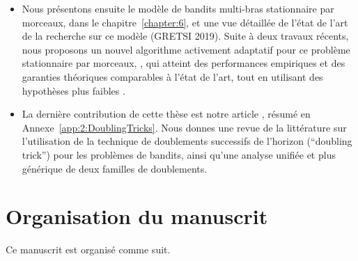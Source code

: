 \begin{resume_fr}
\begin{itemize}
    \item
    Nous présentons ensuite le modèle de bandits multi-bras stationnaire par morceaux, dans le chapitre~\ref{chapter:6}, et une vue détaillée de l'état de l'art de la recherche sur ce modèle \cite{Besson2019GLRT,Besson2019Gretsi} (GRETSI 2019).
    Suite à deux travaux récents, nous proposons un nouvel algorithme activement adaptatif pour ce problème stationnaire par morceaux, \GLRklUCB, qui atteint des performances empiriques et des garanties théoriques comparables à l'état de l'art, tout en utilisant des hypothèses plus faibles .

    \item
    La dernière contribution de cette thèse est notre article \cite{Besson2018DoublingTricks}, résumé en Annexe~\ref{app:2:DoublingTricks}.
    Nous donnes une revue de la littérature sur l'utilisation de la technique de doublements successifs de l'horizon (``doubling trick'') pour les problèmes de bandits,
    ainsi qu'une analyse unifiée et plus générique de deux familles de doublements.
\end{itemize}

\section*{Organisation du manuscrit}

Ce manuscrit est organisé comme suit.


\end{resume_fr}
